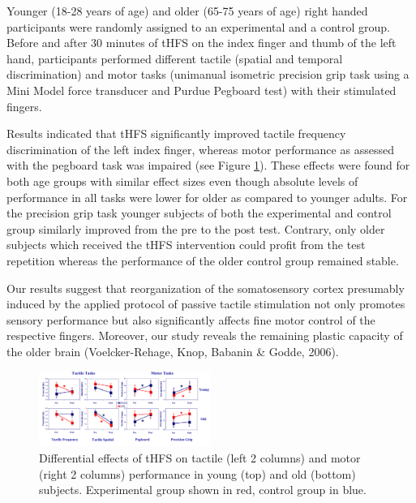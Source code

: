 	Younger (18-28 years of age) and older (65-75 years of age) right handed participants were randomly assigned to an experimental and a control group. Before and after 30 minutes of tHFS on the index finger and thumb of the left hand, participants performed different tactile (spatial and temporal discrimination) and motor tasks (unimanual isometric precision grip task using a Mini Model force transducer and Purdue Pegboard test) with their stimulated fingers.
	
	Results indicated that tHFS significantly improved tactile frequency discrimination of the left index finger, whereas motor performance as assessed with the pegboard task was impaired (see Figure \ref{fig:profBenGodde}). These effects were found for both age groups with similar effect sizes even though absolute levels of performance in all tasks were lower for older as compared to younger adults. For the precision grip task younger subjects of both the experimental and control group similarly improved from the pre to the post test. Contrary, only older subjects which received the tHFS intervention could profit from the test repetition whereas the performance of the older control group remained stable. 
	
	Our results suggest that reorganization of the somatosensory cortex presumably induced by the applied protocol of passive tactile stimulation not only promotes sensory performance but also significantly affects fine motor control of the respective fingers. Moreover, our study reveals the remaining plastic capacity of the older brain (Voelcker-Rehage, Knop, Babanin \& Godde, 2006). 


\begin{figure}[htb]
  \begin{center}
    \includegraphics[width=0.5\textwidth]{profBenGodde-fig1}
    \caption{Differential effects of tHFS on tactile (left 2 columns) and motor (right 2 columns) performance in young (top) and old (bottom) subjects. Experimental group shown in red, control group in blue.}
    \label{fig:profBenGodde}
  \end{center}
\end{figure}





